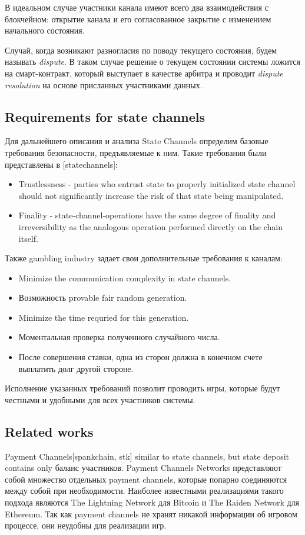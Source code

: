 	В идеальном случае участники канала имеют всего два взаимодействия с блокчейном: открытие канала и его согласованное закрытие с изменением начального состояния. 

	Случай, когда возникают разногласия по поводу текущего состояния, будем называть \textit {dispute}. В таком случае решение о текущем состоянии системы ложится на смарт-контракт, который выступает в качестве арбитра и проводит  \textit {dispute resolution} на основе присланных участниками данных.


		\subsection {Requirements for state channels}
	Для дальнейшего описания и анализа State Channels определим базовые требования безопасности, предъявляемые к ним. Такие требования были представлены в [statechannels]:
	\begin{itemize}
		\item Trustlessness - parties who entrust state to properly initialized state channel should not significantly increase the risk of that state being manipulated. 
		\item Finality - state-channel-operations have the same degree of finality and irreversibility as the analogous operation performed directly on the chain itself.
	\end{itemize}
	Также gambling industry задает свои дополнительные требования к каналам:
	\begin{itemize}
		\item Minimize the communication complexity in state channels.
		\item Возможность provable fair random generation.
		\item Minimize the time requried for this generation.
		\item Моментальная проверка полученного случайного числа. 
		\item После совершения ставки, одна из сторон должна в конечном счете выплатить долг другой стороне. 
	\end{itemize}

	Исполнение указанных требований позволит проводить игры, которые будут честными и удобными для всех участников системы. 
		\subsection {Related works} 
	Payment Channels[spankchain, stk] similar to state channels, but state deposit contains only баланс участников. Payment Channels Networks представляют собой множество отдельных payment channels, которые попарно соединяются между собой при необходимости. Наиболее известными реализациями такого подхода являются The Lightning Network для Bitcoin и The Raiden Network для Ethereum. Так как payment channels не хранят никакой информации об игровом процессе, они неудобны для реализации игр. 

